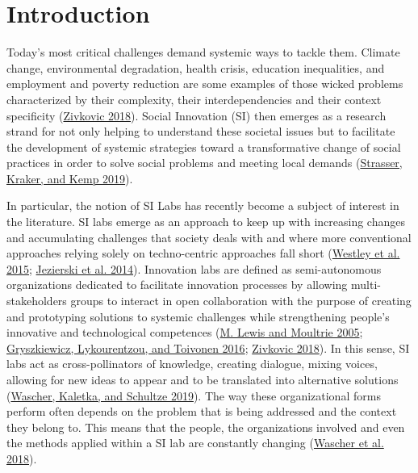\documentclass[AMA,STIX1COL,APA,STIX2COL]{WileyNJD-v2}
\begin{document}
\hypertarget{introduction}{%
\section{Introduction}\label{introduction}}

Today's most critical challenges demand systemic ways to tackle them.
Climate change, environmental degradation, health crisis, education
inequalities, and employment and poverty reduction are some examples of
those wicked problems characterized by their complexity, their
interdependencies and their context specificity
(\protect\hyperlink{ref-Zivkovic2018}{Zivkovic 2018}). Social Innovation
(SI) then emerges as a research strand for not only helping to
understand these societal issues but to facilitate the development of
systemic strategies toward a transformative change of social practices
in order to solve social problems and meeting local demands
(\protect\hyperlink{ref-Strasser2019}{Strasser, Kraker, and Kemp 2019}).

In particular, the notion of SI Labs has recently become a subject of
interest in the literature. SI labs emerge as an approach to keep up
with increasing changes and accumulating challenges that society deals
with and where more conventional approaches relying solely on
techno-centric approaches fall short
(\protect\hyperlink{ref-Westley2015}{Westley et al. 2015};
\protect\hyperlink{ref-Jezierski2014}{Jezierski et al. 2014}).
Innovation labs are defined as semi-autonomous organizations dedicated
to facilitate innovation processes by allowing multi-stakeholders groups
to interact in open collaboration with the purpose of creating and
prototyping solutions to systemic challenges while strengthening
people's innovative and technological competences
(\protect\hyperlink{ref-Lewis2005}{M. Lewis and Moultrie 2005};
\protect\hyperlink{ref-Gryszkiewicz2016}{Gryszkiewicz, Lykourentzou, and
Toivonen 2016}; \protect\hyperlink{ref-Zivkovic2018}{Zivkovic 2018}). In
this sense, SI labs act as cross-pollinators of knowledge, creating
dialogue, mixing voices, allowing for new ideas to appear and to be
translated into alternative solutions
(\protect\hyperlink{ref-Wascher2019}{Wascher, Kaletka, and Schultze
2019}). The way these organizational forms perform often depends on the
problem that is being addressed and the context they belong to. This
means that the people, the organizations involved and even the methods
applied within a SI lab are constantly changing
(\protect\hyperlink{ref-Wascher2018}{Wascher et al. 2018}).
\end{document}
